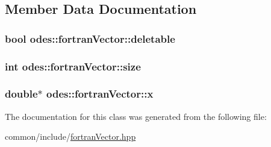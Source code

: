 \subsection{Member Data Documentation}
\hypertarget{classodes_1_1fortranVector_ace9b5d1e721b6f82ed090350181557b6}{
\subsubsection[{deletable}]{\setlength{\rightskip}{0pt plus 5cm}bool odes\-::fortran\-Vector\-::deletable\hspace{0.3cm}{\ttfamily [protected]}}}\label{classodes_1_1fortranVector_ace9b5d1e721b6f82ed090350181557b6}
\hypertarget{classodes_1_1fortranVector_a4734531bec0ccbaf24f22c12969580db}{
\subsubsection[{size}]{\setlength{\rightskip}{0pt plus 5cm}int odes\-::fortran\-Vector\-::size\hspace{0.3cm}{\ttfamily [protected]}}}\label{classodes_1_1fortranVector_a4734531bec0ccbaf24f22c12969580db}
\hypertarget{classodes_1_1fortranVector_aa92f26c38f887fca314d4e031b5ebe29}{
\subsubsection[{x}]{\setlength{\rightskip}{0pt plus 5cm}double$\ast$ odes\-::fortran\-Vector\-::x\hspace{0.3cm}{\ttfamily [protected]}}}\label{classodes_1_1fortranVector_aa92f26c38f887fca314d4e031b5ebe29}


The documentation for this class was generated from the following file\-:\begin{DoxyCompactItemize}
\item 
common/include/\hyperlink{fortranVector_8hpp}{fortran\-Vector.\-hpp}\end{DoxyCompactItemize}
